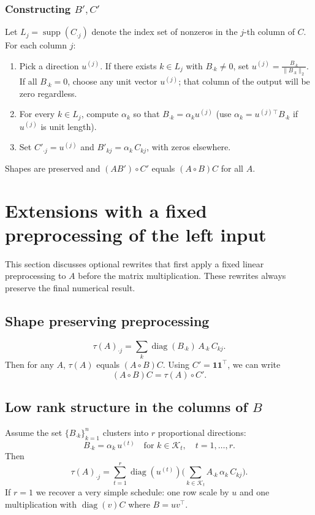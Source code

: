\documentclass[11pt,a4paper]{article}
\theoremstyle{definition}
\newcommand{\Had}{\circ}
\newcommand{\diag}{\operatorname{diag}}
\newcommand{\supp}{\operatorname{supp}}
\begin{document}
\subsubsection*{Constructing $B',C'$}
Let \(L_j=\supp(C_{\cdot j})\) denote the index set of nonzeros in the $j$-th column of $C$. For each column $j$:
\begin{enumerate}[label=\arabic*)]
  \item Pick a direction $u^{(j)}$. If there exists $k\in L_j$ with $B_{\cdot k}\ne 0$, set $u^{(j)}=\frac{B_{\cdot k}}{\|B_{\cdot k}\|_2}$. If all $B_{\cdot k}=0$, choose any unit vector $u^{(j)}$; that column of the output will be zero regardless.
  \item For every $k\in L_j$, compute $\alpha_k$ so that $B_{\cdot k}=\alpha_k u^{(j)}$ (use $\alpha_k=u^{(j)}{}^\top B_{\cdot k}$ if $u^{(j)}$ is unit length).
  \item Set $C'_{\cdot j}=u^{(j)}$ and $B'_{k j}=\alpha_k\,C_{k j}$, with zeros elsewhere.
\end{enumerate}
Shapes are preserved and $(A B')\Had C'$ equals $(A\Had B)C$ for all $A$.

\section{Extensions with a fixed preprocessing of the left input}
\label{sec:tau-extensions}
This section discusses optional rewrites that first apply a fixed linear preprocessing to $A$ before the matrix multiplication. These rewrites always preserve the final numerical result.

\subsection{Shape preserving preprocessing}
\begin{equation}
\tau(A)_{\cdot j}=\sum_{k} \diag(B_{\cdot k})\,A_{\cdot k}\,C_{k j}.
\label{eq:tau-rank}
\end{equation}
Then for any $A$, $\tau(A)$ equals $(A\Had B)C$. Using $C'=\bm{1}\bm{1}^\top$, we can write
\begin{equation}
(A\Had B)C=\tau(A)\Had C'.
\label{eq:tau-lift}
\end{equation}

\subsection{Low rank structure in the columns of \texorpdfstring{$B$}{B}}\label{sec:ext-lowrank}
Assume the set $\{B_{\cdot k}\}_{k=1}^n$ clusters into $r$ proportional directions:
\[
B_{\cdot k}=\alpha_k\,u^{(t)} \quad \text{for } k\in \mathcal{K}_t,\quad t=1,\dots,r.
\]
Then
\[
\tau(A)_{\cdot j}=\sum_{t=1}^r \diag(u^{(t)})\Big(\sum_{k\in\mathcal{K}_t} A_{\cdot k}\,\alpha_k\,C_{k j}\Big).
\]
If $r=1$ we recover a very simple schedule: one row scale by $u$ and one multiplication with $\diag(v)C$ where $B=uv^\top$.
\end{document}
